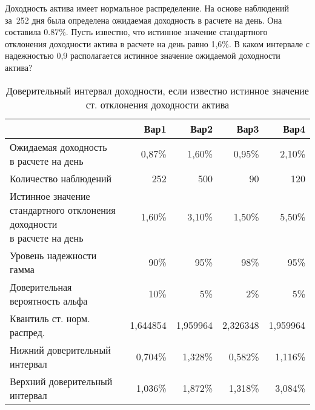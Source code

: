 \documentclass[12pt,a4paper]{article}
\begin{document}
\begin{taskrus}
Доходность актива имеет нормальное распределение. На основе наблюдений за~252 дня была определена ожидаемая доходность в расчете на день. Она составила 0.87\%. Пусть известно, что истинное значение стандартного отклонения доходности актива в расчете на день равно 1,6\%. В каком интервале с надежностью 0,9 располагается истинное значение ожидаемой доходности актива?
\begin{table}[H]
  \centering
  \caption{Доверительный интервал доходности, если известно истинное значение ст. отклонения доходности актива}
    \begin{tabular}{lrrrr}
    \toprule
          & Вар1  & Вар2  & Вар3  & Вар4 \\
    \midrule
    \specialcell{Ожидаемая доходность\\в расчете на день } & 0,87\% & 1,60\% & 0,95\% & 2,10\% \\
    Количество наблюдений & 252   & 500   & 90    & 120 \\
    \specialcell{Истинное значение\\стандартного отклонения доходности\\в расчете на день} & 1,60\% & 3,10\% & 1,50\% & 5,50\% \\
    Уровень надежности гамма & 90\%  & 95\%  & 98\%  & 95\% \\
    \midrule
    Доверительная вероятность альфа & 10\%  & 5\%   & 2\%   & 5\% \\
    Квантиль ст. норм. распред. & 1,644854 & 1,959964 & 2,326348 & 1,959964 \\
    Нижний доверительный интервал & 0,704\% & 1,328\% & 0,582\% & 1,116\% \\
    Верхний доверительный интервал & 1,036\% & 1,872\% & 1,318\% & 3,084\% \\
    \bottomrule
    \end{tabular}%
  \label{tab:addlabel}%
\end{table}%
\end{taskrus}

\pagebreak
\end{document}
